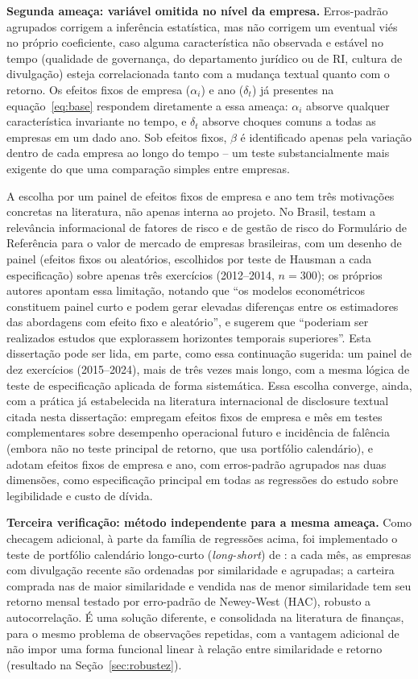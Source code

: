 \documentclass[a4paper,12pt]{report}
\begin{document}
\textbf{Segunda ameaça: variável omitida no nível da empresa.} Erros-padrão agrupados corrigem a inferência estatística, mas não corrigem um eventual viés no próprio coeficiente, caso alguma característica não observada e estável no tempo (qualidade de governança, do departamento jurídico ou de RI, cultura de divulgação) esteja correlacionada tanto com a mudança textual quanto com o retorno. Os efeitos fixos de empresa ($\alpha_i$) e ano ($\delta_t$) já presentes na equação~\ref{eq:base} respondem diretamente a essa ameaça: $\alpha_i$ absorve qualquer característica invariante no tempo, e $\delta_t$ absorve choques comuns a todas as empresas em um dado ano. Sob efeitos fixos, $\beta$ é identificado apenas pela variação dentro de cada empresa ao longo do tempo -- um teste substancialmente mais exigente do que uma comparação simples entre empresas.

A escolha por um painel de efeitos fixos de empresa e ano tem três motivações concretas na literatura, não apenas interna ao projeto. No Brasil,  testam a relevância informacional de fatores de risco e de gestão de risco do Formulário de Referência para o valor de mercado de empresas brasileiras, com um desenho de painel (efeitos fixos ou aleatórios, escolhidos por teste de Hausman a cada especificação) sobre apenas três exercícios (2012--2014, $n=300$); os próprios autores apontam essa limitação, notando que ``os modelos econométricos constituem painel curto e podem gerar elevadas diferenças entre os estimadores das abordagens com efeito fixo e aleatório'', e sugerem que ``poderiam ser realizados estudos que explorassem horizontes temporais superiores''. Esta dissertação pode ser lida, em parte, como essa continuação sugerida: um painel de dez exercícios (2015--2024), mais de três vezes mais longo, com a mesma lógica de teste de especificação aplicada de forma sistemática. Essa escolha converge, ainda, com a prática já estabelecida na literatura internacional de disclosure textual citada nesta dissertação:  empregam efeitos fixos de empresa e mês em testes complementares sobre desempenho operacional futuro e incidência de falência (embora não no teste principal de retorno, que usa portfólio calendário), e  adotam efeitos fixos de empresa e ano, com erros-padrão agrupados nas duas dimensões, como especificação principal em todas as regressões do estudo sobre legibilidade e custo de dívida.

\textbf{Terceira verificação: método independente para a mesma ameaça.} Como checagem adicional, à parte da família de regressões acima, foi implementado o teste de portfólio calendário longo-curto (\textit{long-short}) de : a cada mês, as empresas com divulgação recente são ordenadas por similaridade e agrupadas; a carteira comprada nas de maior similaridade e vendida nas de menor similaridade tem seu retorno mensal testado por erro-padrão de Newey-West (HAC), robusto a autocorrelação. É uma solução diferente, e consolidada na literatura de finanças, para o mesmo problema de observações repetidas, com a vantagem adicional de não impor uma forma funcional linear à relação entre similaridade e retorno (resultado na Seção~\ref{sec:robustez}).
\end{document}
